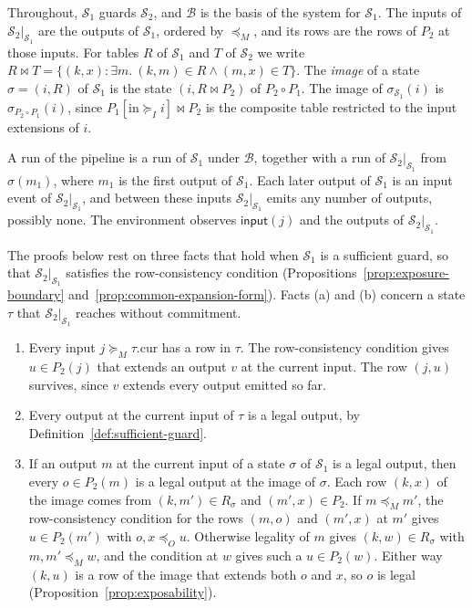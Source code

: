 \documentclass[sigconf]{cidr-2027}
\theoremstyle{remark}
\newcommand{\OutputOrd}{\preceq_O}
\newcommand{\InputGe}{\succeq_I}
\newcommand{\commitment}{commitment\xspace}
\newcommand{\indescs}{input extensions\xspace}
\newcommand{\outrel}{extends\xspace}          %
\newcommand{\Spec}{\mathcal{S}}
\begin{document}
Throughout, $\Spec_1$ guards $\Spec_2$, and $\mathcal B$ is the basis of the
system for $\Spec_1$. The inputs of $\Spec_2|_{\Spec_1}$ are the outputs of
$\Spec_1$, ordered by $\preceq_M$, and its rows are the rows of $P_2$ at those
inputs. For tables $R$ of $\Spec_1$ and $T$ of $\Spec_2$ we write $R\Join
T=\{(k,x):\exists m.\ (k,m)\in R\land(m,x)\in T\}$. The \emph{image} of a
state $\sigma=(i,R)$ of $\Spec_1$ is the state $(i,R\Join P_2)$ of
$P_2\circ P_1$. The image of $\sigma_{\Spec_1}(i)$ is
$\sigma_{P_2\circ P_1}(i)$, since $P_1[\mathrm{in}\InputGe i]\Join P_2$ is the
composite table restricted to the \indescs of $i$.

A run of the pipeline is a run of $\Spec_1$ under $\mathcal B$, together with
a run of $\Spec_2|_{\Spec_1}$ from $\sigma(m_1)$, where $m_1$ is the first
output of $\Spec_1$. Each later output of $\Spec_1$ is an input event of
$\Spec_2|_{\Spec_1}$, and between these inputs $\Spec_2|_{\Spec_1}$ emits any
number of outputs, possibly none. The environment observes
$\mathsf{input}(j)$ and the outputs of $\Spec_2|_{\Spec_1}$.

The proofs below rest on three facts that hold when $\Spec_1$ is a sufficient
guard, so that $\Spec_2|_{\Spec_1}$ satisfies the row-consistency condition
(Propositions~\ref{prop:exposure-boundary}
and~\ref{prop:common-expansion-form}). Facts (a) and (b) concern a state $\tau$ that
$\Spec_2|_{\Spec_1}$ reaches without \commitment.
\begin{enumerate}[label=(\alph*)]
\item
Every input $j\succeq_M\tau.\mathrm{cur}$ has a row in $\tau$. The
  row-consistency condition gives $u\in P_2(j)$ that \outrel an output $v$ at
  the current input. The row $(j,u)$ survives, since $v$ \outrel every output
  emitted so far.
\item
Every output at the current input of $\tau$ is a legal output, by
  Definition~\ref{def:sufficient-guard}.
\item
If an output $m$ at the current input of a state $\sigma$ of $\Spec_1$
  is a legal output, then every $o\in P_2(m)$ is a legal output at the image
  of $\sigma$. Each row $(k,x)$ of the image comes from $(k,m')\in R_\sigma$
  and $(m',x)\in P_2$. If $m\preceq_M m'$, the row-consistency condition for
  the rows $(m,o)$ and $(m',x)$ at $m'$ gives $u\in P_2(m')$ with
  $o,x\OutputOrd u$. Otherwise legality of $m$ gives $(k,w)\in R_\sigma$ with
  $m,m'\preceq_M w$, and the condition at $w$ gives such a $u\in P_2(w)$. Either way $(k,u)$ is a row of the image that \outrel both $o$ and $x$, so
  $o$ is legal (Proposition~\ref{prop:exposability}).
\end{enumerate}
\end{document}
